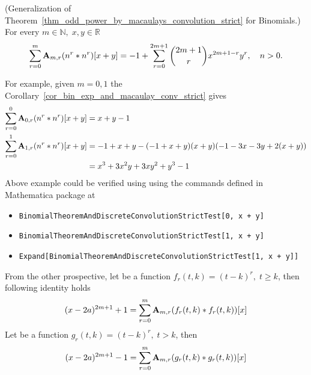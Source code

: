 \begin{cor}
    \label{cor_bin_exp_and_macaulay_conv_strict}
    (Generalization of Theorem~\ref{thm_odd_power_by_macaulays_convolution_strict} for Binomials.)
    For every $m\in\mathbb{N}, \; x,y\in\mathbb{R}$
    \begin{equation*}
        \sum_{r=0}^{m} {\mathbf{A}} \sb{m,r} (n \sp{r} \ast n \sp{r}) [x+y]
        =
        -1 + \sum_{r=0}^{2m+1} \binom{2m+1}{r} x^{2m+1-r} y^r, \quad n > 0.
    \end{equation*}
\end{cor}
For example, given $m=0,1$ the Corollary~\ref{cor_bin_exp_and_macaulay_conv_strict} gives
\begin{equation*}
    \begin{split}
        \sum_{r=0}^{0} {\mathbf{A}} \sb{0,r} (n \sp{r} \ast n \sp{r}) [x+y]
        &= x + y - 1 \\
        \sum_{r=0}^{1} {\mathbf{A}} \sb{1,r} (n \sp{r} \ast n \sp{r}) [x+y]
        &= -1 + x + y - (-1 + x + y) (x + y) (-1 - 3 x - 3 y + 2 (x + y)) \\
        &= x^3 + 3 x^2 y + 3 x y^2 + y^3 - 1
    \end{split}
\end{equation*}
Above example could be verified using using the commands defined in Mathematica package at~\cite{PK22Source}
\begin{itemize}
    \item \texttt{BinomialTheoremAndDiscreteConvolutionStrictTest[0, x + y]}
    \item \texttt{BinomialTheoremAndDiscreteConvolutionStrictTest[1, x + y]}
    \item \texttt{Expand[BinomialTheoremAndDiscreteConvolutionStrictTest[1, x + y]]}
\end{itemize}
From the other prospective, let be a function $f_r(t,k) = (t-k)^r, \; t \geq k$, then following identity holds
\begin{equation}
(x-2a)
    ^{2m+1} + 1 =\sum_{r=0}^{m} {\mathbf{A}} \sb{m,r} (f_r(t,k) \ast f_r(t,k))[x]
    \label{eq:parametric-identity}
\end{equation}
Let be a function $g_r(t,k) = (t-k)^r, \; t > k$, then
\begin{equation}
(x-2a)
    ^{2m+1} - 1 =\sum_{r=0}^{m} {\mathbf{A}} \sb{m,r} (g_r(t,k) \ast g_r(t,k))[x]
    \label{eq:parametric-identity-strict}
\end{equation}

